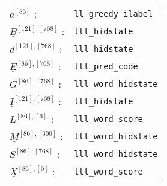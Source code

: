 \begin{tabular}{ll}
$\underline{a}^{[86]}$ :&{\tt ll\_greedy\_ilabel}\\
$\underline{B}^{[121], [768]}$ :&{\tt lll\_hidstate}\\
$\underline{d}^{[121], [768]}$ :&{\tt lll\_hidstate}\\
$\underline{E}^{[86], [768]}$ :&{\tt lll\_pred\_code}\\
$\underline{G}^{[86], [768]}$ :&{\tt lll\_word\_hidstate}\\
$\underline{I}^{[121], [768]}$ :&{\tt lll\_hidstate}\\
$\underline{L}^{[86], [6]}$ :&{\tt lll\_word\_score}\\
$\underline{M}^{[86], [300]}$ :&{\tt lll\_word\_hidstate}\\
$\underline{S}^{[86], [768]}$ :&{\tt lll\_word\_hidstate}\\
$\underline{X}^{[86], [6]}$ :&{\tt lll\_word\_score}
\end{tabular}



